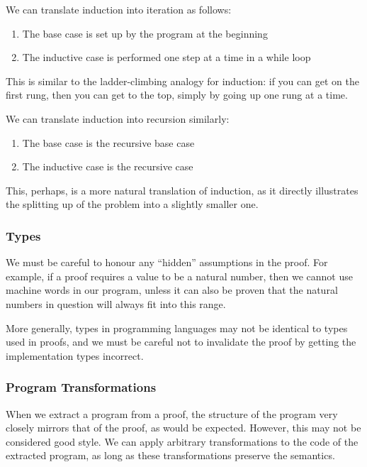 We can translate induction into iteration as follows:

\begin{enumerate}
  \item The base case is set up by the program at the beginning
  \item The inductive case is performed one step at a time in a while
    loop
\end{enumerate}

This is similar to the ladder-climbing analogy for induction: if you
can get on the first rung, then you can get to the top, simply by
going up one rung at a time.

We can translate induction into recursion similarly:

\begin{enumerate}
  \item The base case is the recursive base case
  \item The inductive case is the recursive case
\end{enumerate}

This, perhaps, is a more natural translation of induction, as it
directly illustrates the splitting up of the problem into a slightly
smaller one.

\subsubsection{Types}
\label{sec:lit-verification-extraction-types}

We must be careful to honour any ``hidden'' assumptions in the
proof. For example, if a proof requires a value to be a natural
number, then we cannot use machine words in our program, unless it can
also be proven that the natural numbers in question will always fit
into this range.

More generally, types in programming languages may not be identical to
types used in proofs, and we must be careful not to invalidate the
proof by getting the implementation types incorrect.

\subsubsection{Program Transformations}
\label{sec:lit-verification-extraction-transformation}

When we extract a program from a proof, the structure of the program
very closely mirrors that of the proof, as would be expected. However,
this may not be considered good style. We can apply arbitrary
transformations to the code of the extracted program, as long as these
transformations preserve the semantics.


